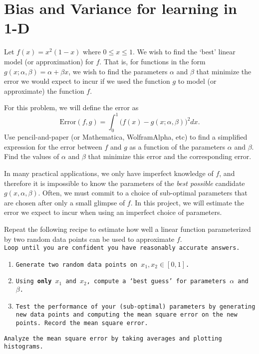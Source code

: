 \section{Bias and Variance for learning in 1-D}

Let $f(x) = x^2(1-x)$ where $0 \leq x \leq 1$. We wish to find the `best' linear model (or approximation) for $f$. That is, for functions in the form $g(x; \alpha, \beta) =  \alpha +  \beta x$,  we wish to find the parameters $ \alpha$ and $ \beta$ that minimize the error we would expect to incur if we used the function $g$ to model (or approximate) the function $f$. 
\begin{center}
\end{center}
For this problem, we will define the error as
\begin{equation*}
\text{Error}(f,g) = \int_0^1 \bigg(f(x) - g(x; \alpha, \beta)\bigg)^2 dx.
\end{equation*} 
Use pencil-and-paper (or Mathematica, WolframAlpha, etc) to find a simplified expression for the error between $f$ and $g$ as a function of the parameters $ \alpha$ and $ \beta$. Find the values of $ \alpha$ and $ \beta$ that minimize this error and the corresponding error.

In many practical applications, we only have imperfect knowledge of $f$, and therefore it is impossible to know the parameters of the \textit{best possible} candidate $g(x, \alpha, \beta)$. Often, we must commit to a choice of sub-optimal parameters that are chosen after only a small glimpse of $f$. In this project, we will estimate the error we expect to incur when using an imperfect choice of parameters.


Repeat the following recipe to estimate how well a linear function parameterized by two random data points can be used to approximate $f$.\\

\texttt{Loop until you are confident you have reasonably accurate answers.}
\begin{enumerate}\setlength{\itemsep}{0pt}
    \item \texttt{Generate two random data points on $x_1, x_2 \in [0,1]$.}
    \item \texttt{Using \textbf{only} $x_1$ and $x_2$, compute a `best guess' for parameters $\alpha$ and $\beta$.}
    \item \texttt{Test the performance of your (sub-optimal) parameters by generating new data points and computing the mean square error on the new points. Record the mean square error.}
\end{enumerate}
\texttt{Analyze the mean square error by taking averages and plotting histograms.}

